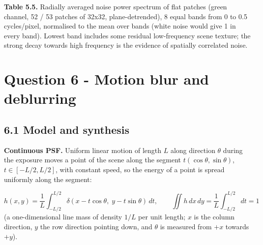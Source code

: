 \documentclass[10pt,a4paper]{article}
\begin{document}
\begin{table}[H]\centering\scriptsize{\small\textbf{Table 5.5.} Radially averaged noise power spectrum of flat patches (green channel, 52 / 53 patches of 32x32, plane-detrended), 8 equal bands from 0 to 0.5 cycles/pixel, normalised to the mean over bands (white noise would give 1 in every band). Lowest band includes some residual low-frequency scene texture; the strong decay towards high frequency is the evidence of spatially correlated noise.\par}\vskip 3pt
\end{table}
\section{Question 6 - Motion blur and deblurring}
\subsection{6.1 Model and synthesis}
\textbf{Continuous PSF.} Uniform linear motion of length $L$ along direction $\theta$ during the exposure moves a point of the scene along the segment $t(\cos\theta,\sin\theta)$, $t\in[-L/2,L/2]$, with constant speed, so the energy of a point is spread uniformly along the segment:

\begin{equation}h(x,y)=\frac1L\int_{-L/2}^{L/2}\delta(x-t\cos\theta,\;y-t\sin\theta)\,dt,\qquad \iint h\,dx\,dy=\frac1L\int_{-L/2}^{L/2}dt=1\end{equation}
(a one-dimensional line mass of density $1/L$ per unit length; $x$ is the column direction, $y$ the row direction pointing down, and $\theta$ is measured from $+x$ towards $+y$).
\end{document}
